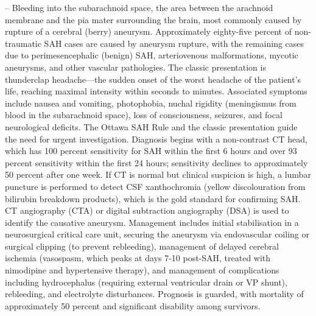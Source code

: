 -- Bleeding into the subarachnoid space, the area between the arachnoid membrane and the pia mater surrounding the brain, most commonly caused by rupture of a cerebral (berry) aneurysm. Approximately eighty-five percent of non-traumatic SAH cases are caused by aneurysm rupture, with the remaining cases due to perimesencephalic (benign) SAH, arteriovenous malformations, mycotic aneurysms, and other vascular pathologies. The classic presentation is thunderclap headache—the sudden onset of the worst headache of the patient's life, reaching maximal intensity within seconds to minutes. Associated symptoms include nausea and vomiting, photophobia, nuchal rigidity (meningismus from blood in the subarachnoid space), loss of consciousness, seizures, and focal neurological deficits. The Ottawa SAH Rule and the classic presentation guide the need for urgent investigation. Diagnosis begins with a non-contrast CT head, which has 100 percent sensitivity for SAH within the first 6 hours and over 93 percent sensitivity within the first 24 hours; sensitivity declines to approximately 50 percent after one week. If CT is normal but clinical suspicion is high, a lumbar puncture is performed to detect CSF xanthochromia (yellow discolouration from bilirubin breakdown products), which is the gold standard for confirming SAH. CT angiography (CTA) or digital subtraction angiography (DSA) is used to identify the causative aneurysm. Management includes initial stabilisation in a neurosurgical critical care unit, securing the aneurysm via endovascular coiling or surgical clipping (to prevent rebleeding), management of delayed cerebral ischemia (vasospasm, which peaks at days 7-10 post-SAH, treated with nimodipine and hypertensive therapy), and management of complications including hydrocephalus (requiring external ventricular drain or VP shunt), rebleeding, and electrolyte disturbances. Prognosis is guarded, with mortality of approximately 50 percent and significant disability among survivors.

